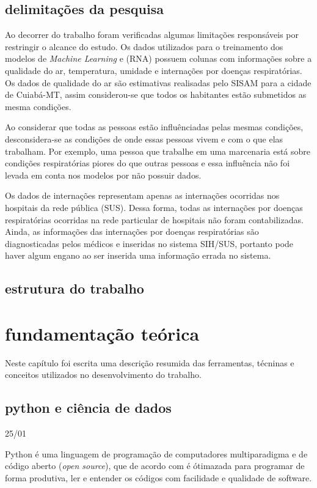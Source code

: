\documentclass[
  12pt,		%
  a4paper,	%
  openright,%
  oneside,	%
  chapter=TITLE,		%
  section=TITLE,		%
  english,	%
  french,	%
  spanish,	%
  brazil	%
]{abntex2}
\begin{document}
    \section{delimitações da pesquisa}
    Ao decorrer do trabalho foram verificadas algumas limitações responsáveis por restringir o alcance do estudo.
    Os dados utilizados para o treinamento dos modelos de \textit{Machine Learning} e (RNA) possuem 
    colunas com informações sobre a qualidade do ar, temperatura, umidade e internações por doenças respiratórias. Os dados de qualidade
    do ar são estimativas realisadas pelo SISAM para a cidade de Cuiabá-MT, assim considerou-se que todos os habitantes 
    estão submetidos as mesma condições.

    Ao considerar que todas as pessoas estão influênciadas pelas mesmas condições, desconsidera-se 
    as condições de onde essas pessoas vivem e com o que elas trabalham. Por exemplo, uma pessoa que trabalhe em uma marcenaria
    está sobre condições respiratórias piores do que outras pessoas e essa influência não foi levada em conta nos modelos por não possuir dados.

    Os dados de internações representam apenas as internações ocorridas nos hospitais da rede pública (SUS). Dessa forma, todas as internações
    por doenças respiratórias ocorridas na rede particular de hospitais não foram contabilizadas. Ainda, as informações das internações por doenças 
    respiratórias são diagnosticadas pelos médicos e inseridas no sistema SIH/SUS, portanto pode haver algum engano ao ser inserida uma informação
    errada no sistema.

    \section{estrutura do trabalho}

    \chapter{fundamentação teórica}
    Neste capítulo foi escrita uma descrição resumida das ferramentas, técninas e conceitos utilizados
    no desenvolvimento do trabalho.
    \section{python e ciência de dados}
    25/01
    
    Python é uma linguagem de programação de computadores multiparadigma e de código aberto (\textit{open source}), 
    que de acordo com \cite[]{learning_python} é ótimazada para programar de forma produtiva, ler e entender os códigos
    com facilidade e qualidade de software.
\end{document}

